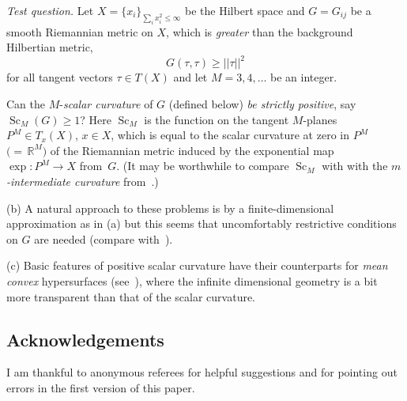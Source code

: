 \documentclass[pdftex]{sigma}
\numberwithin{equation}{section}
\begin{document}
 {\it Test question.} Let $X=\{x_i\}_{\sum_i x_i^2\leq\infty}$ be the Hilbert space and $G=G_{ij}$ be a smooth Riemannian metric on $X$, which is {\it greater} than the background Hilbertian metric,{\samepage
\[
G(\tau,\tau)\geq ||\tau||^2
\]
 for all tangent vectors $ \tau\in T(X)$ and let $M=3,4,\dots$ be an integer.}

 Can the $M$-{\it scalar curvature} of $G$ (defined below) {\it be strictly positive}, say
$\operatorname{Sc}_M(G)\geq 1$?
 Here $\operatorname{Sc}_M$ is the function on the tangent $M$-planes
 $P^M\in T_x(X)$, $x\in X$, which is equal to the scalar curvature at zero in $P^M$ $\bigl({=}\,\mathbb R^M\bigr)$ of the Riemannian metric induced by the exponential map $\exp\colon P^M\to X$ from~$G$. (It may be worthwhile to compare $\operatorname{Sc}_M$ with
 with the {\it $m$-intermediate curvature} from~\cite{BHG2022}.)

(b) A natural approach to these problems is by a finite-dimensional approximation as in (a) but this seems that uncomfortably restrictive conditions on $G$
are needed (compare with~\cite{Gr2014}).

(c) Basic features of positive scalar curvature have their counterparts
for {\it mean convex} hypersurfaces (see~\cite{Gr2019}), where the infinite dimensional geometry is a bit more transparent than that of the scalar curvature.

\subsection*{Acknowledgements}
I am thankful to anonymous referees for helpful suggestions and for pointing out errors in the first version of this paper.
\end{document}
